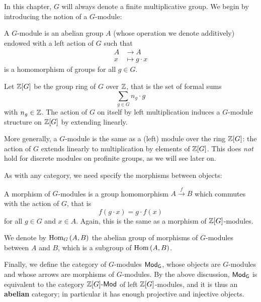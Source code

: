 \documentclass[a4paper, oneside]{memoir}
\begin{document}
In this chapter, $G$ will always denote a finite multiplicative group. We begin by introducing the notion of a $G$-module:

\begin{definition}
    A $G$-module is an abelian group $A$ (whose operation we denote additively) endowed with a left action of $G$ such that
    \begin{align*}
        A & \longrightarrow A    \\
        x & \longmapsto g\cdot x
    \end{align*}
    is a homomorphism of groups for all $g\in G$.
\end{definition}

\begin{remark}
    Let $\mathbb{Z}[G]$ be the group ring of $G$ over $\mathbb{Z}$, that is the set of formal sums
    \[
        \sum_{g\in G}{n_g\cdot g}
    \]
    with $n_g\in\mathbb{Z}$. The action of $G$ on itself by left multiplication induces a $G$-module structure on $\mathbb{Z}[G]$ by extending linearly.

    More generally, a $G$-module is the same as a (left) module over the ring $\mathbb{Z}[G]$: the action of $G$ extends linearly to multiplication by elements of $\mathbb{Z}[G]$. This does \textit{not} hold for discrete modules on profinite groups, as we will see later on.
\end{remark}

As with any category, we need specify the morphisms between objects:

\begin{definition}
    A morphism of $G$-modules is a group homomorphism $A\overset{f}{\to} B$ which commutes with the action of $G$, that is
    \[
        f(g\cdot x)=g\cdot f(x)
    \]
    for all $g\in G$ and $x\in A$. Again, this is the same as a morphism of $\mathbb{Z}[G]$-modules.
\end{definition}

\noindent We denote by $\operatorname{Hom}_G{(A,B)}$ the abelian group of morphisms of $G$-modules between $A$ and $B$, which is a subgroup of $\operatorname{Hom}{(A,B)}$.

\medskip Finally, we define the category of $G$-modules $\mathsf{Mod}_\mathsf{G}$, whose objects are $G$-modules and whose arrows are morphisms of $G$-modules. By the above discussion, $\mathsf{Mod}_\mathsf{G}$ is equivalent to the category $\mathbb{Z}[G]\text{-}\mathsf{Mod}$ of left $\mathbb{Z}[G]$-modules, and it is thus an \textbf{abelian} category; in particular it has enough projective and injective objects.
\end{document}
